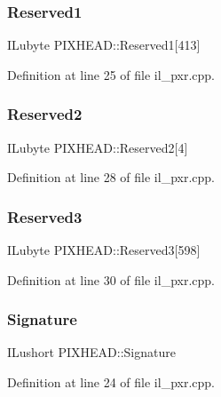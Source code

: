 \subsubsection{\texorpdfstring{Reserved1}{Reserved1}}
{\footnotesize\ttfamily I\+Lubyte P\+I\+X\+H\+E\+A\+D\+::\+Reserved1\mbox{[}413\mbox{]}}



Definition at line 25 of file il\+\_\+pxr.\+cpp.

\mbox{\label{structPIXHEAD_aa6ac55aae6e793f840cf73c2be46001d}} 
\subsubsection{\texorpdfstring{Reserved2}{Reserved2}}
{\footnotesize\ttfamily I\+Lubyte P\+I\+X\+H\+E\+A\+D\+::\+Reserved2\mbox{[}4\mbox{]}}



Definition at line 28 of file il\+\_\+pxr.\+cpp.

\mbox{\label{structPIXHEAD_a124cfa86118799e626efee3780a83aff}} 
\subsubsection{\texorpdfstring{Reserved3}{Reserved3}}
{\footnotesize\ttfamily I\+Lubyte P\+I\+X\+H\+E\+A\+D\+::\+Reserved3\mbox{[}598\mbox{]}}



Definition at line 30 of file il\+\_\+pxr.\+cpp.

\mbox{\label{structPIXHEAD_ab2f5663030ae61d00259d1250c8e5a50}} 
\subsubsection{\texorpdfstring{Signature}{Signature}}
{\footnotesize\ttfamily I\+Lushort P\+I\+X\+H\+E\+A\+D\+::\+Signature}



Definition at line 24 of file il\+\_\+pxr.\+cpp.

